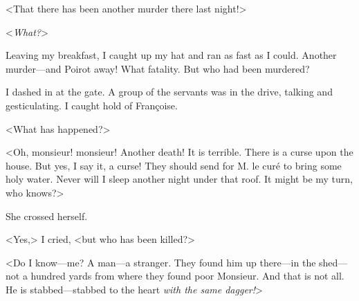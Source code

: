  <That there has been another murder there last night!> 

 <\emph{What?}> 

 Leaving my breakfast, I caught up my hat and ran as fast as I could. Another murder—and Poirot away! What fatality. But who had been murdered? 

 I dashed in at the gate. A group of the servants was in the drive, talking and gesticulating. I caught hold of Françoise. 

 <What has happened?> 

 <Oh, monsieur! monsieur! Another death! It is terrible. There is a curse upon the house. But yes, I say it, a curse! They should send for M. le curé to bring some holy water. Never will I sleep another night under that roof. It might be my turn, who knows?> 

 She crossed herself. 

 <Yes,> I cried, <but who has been killed?> 

 <Do I know—me? A man—a stranger. They found him up there—in the shed—not a hundred yards from where they found poor Monsieur. And that is not all. He is stabbed—stabbed to the heart \emph{with the same dagger!}>